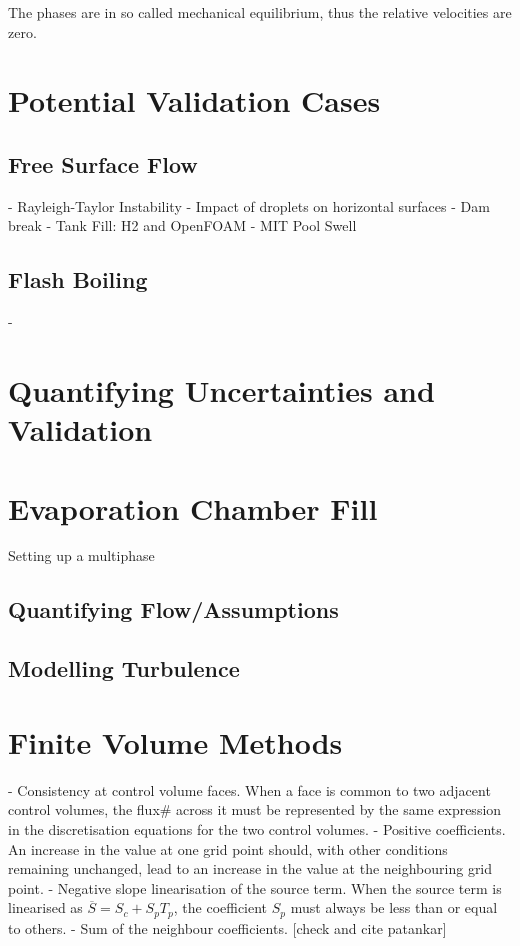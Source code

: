 The phases are in so called mechanical equilibrium, thus the relative velocities are zero.~\cite{wornerCompactIntroductionNumerical}

\section{Potential Validation Cases}
\subsection{Free Surface Flow}
- Rayleigh-Taylor Instability
- Impact of droplets on horizontal surfaces
- Dam break
- Tank Fill: H2 and OpenFOAM
- MIT Pool Swell
\subsection{Flash Boiling}
- \cite{yadigarogluInterfacialInstabilities2018}
\section{Quantifying Uncertainties and Validation}

\section{Evaporation Chamber Fill}
Setting up a multiphase 
    
\subsection{Quantifying Flow/Assumptions}
\subsection{Modelling Turbulence}

\section{Finite Volume Methods}
- Consistency at control volume faces. When a face is common to two adjacent control volumes, the flux#
across it must be represented by the same expression in the discretisation equations
for the two control volumes.
- Positive coefficients. An increase in the value at one grid point should,
with other conditions remaining unchanged, lead to an increase in the value
at the neighbouring grid point.
- Negative slope linearisation of the source term. When the source
term is linearised as $\overbar{S} = S_c + S_{p}T_{p}$, the coefficient $S_{p}$ must always
be less than or equal to others.
- Sum of the neighbour coefficients. [check and cite patankar]
